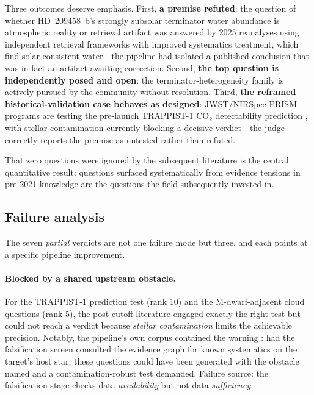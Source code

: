 Three outcomes deserve emphasis. First, \textbf{a premise refuted}: the
question of whether HD~209458~b's strongly subsolar terminator water
abundance \citep{macdonald2017} is atmospheric reality or retrieval
artifact was answered by 2025 reanalyses using independent retrieval
frameworks with improved systematics treatment, which find
solar-consistent water---the pipeline had isolated a published
conclusion that was in fact an artifact awaiting correction. Second,
\textbf{the top question is independently posed and open}: the
terminator-heterogeneity family is actively pursued by the community
without resolution. Third, \textbf{the reframed historical-validation
case behaves as designed}: JWST/NIRSpec PRISM programs are testing the
pre-launch TRAPPIST-1 CO$_2$ detectability prediction
\citep{lustigyaeger2019}, with stellar contamination \citep{rackham2018}
currently blocking a decisive verdict---the judge correctly reports the
premise as untested rather than refuted.

That zero questions were ignored by the subsequent literature is the
central quantitative result: questions surfaced systematically from
evidence tensions in pre-2021 knowledge are the questions the field
subsequently invested in.

\subsection{Failure analysis}
\label{sec:experiments:failures}

The seven \emph{partial} verdicts are not one failure mode but three,
and each points at a specific pipeline improvement.

\paragraph{Blocked by a shared upstream obstacle.}
For the TRAPPIST-1 prediction test (rank 10) and the M-dwarf-adjacent
cloud questions (rank 5), the post-cutoff literature engaged exactly the
right test but could not reach a verdict because \emph{stellar
contamination} limits the achievable precision. Notably, the pipeline's
own corpus contained the warning \citep{rackham2018}: had the
falsification screen consulted the evidence graph for known
systematics on the target's host star, these questions could have been
generated with the obstacle named and a contamination-robust test
demanded. Failure source: the falsification stage checks data
\emph{availability} but not data \emph{sufficiency}.

